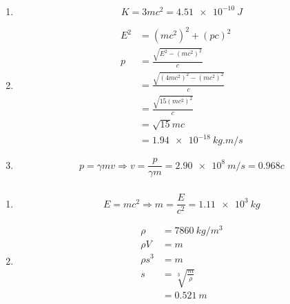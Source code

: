 \documentclass{article}
\begin{document}
\setcounter{subsubsection}{32}
\subsubsection{}

\begin{enumerate}
  \item \[K = 3 m c^2 = \qty{4.51e-10}{J}\]

  \item

        \begin{align*}
          E^2 & = (m c^2)^2 + (p c)^2                      \\
          p   & = \frac{\sqrt{E^2 - (m c^2)^2}}{c}         \\
              & = \frac{\sqrt{(4 m c^2)^2 - (m c^2)^2}}{c} \\
              & = \frac{\sqrt{15 (m c^2)^2}}{c}            \\
              & = \sqrt{15} m c                            \\
              & = \qty{1.94e-18}{kg.m/s}
        \end{align*}

  \item \[p = \gamma m v \Rightarrow v = \frac{p}{\gamma m} = \qty{2.90e8}{m/s} = 0.968 c\]
\end{enumerate}

\setcounter{subsubsection}{34}
\subsubsection{}

\begin{enumerate}
  \item \[E = m c^2 \Rightarrow m = \frac{E}{c^2} = \qty{1.11e3}{kg}\]

  \item

        \begin{align*}
          \rho     & = \qty{7860}{kg/m^3}       \\
          \rho V   & = m                        \\
          \rho s^3 & = m                        \\
          s        & = \sqrt[3]{\frac{m}{\rho}} \\
                   & = \qty{0.521}{m}
        \end{align*}
\end{enumerate}
\end{document}
